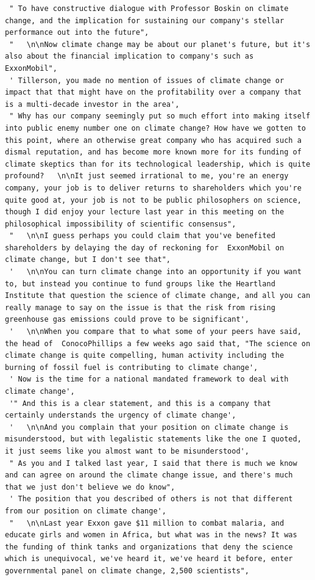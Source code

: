 \documentclass[
  letterpaper,
  DIV=11,
  numbers=noendperiod]{scrreprt}
\begin{document}
\begin{verbatim}
 " To have constructive dialogue with Professor Boskin on climate change, and the implication for sustaining our company's stellar performance out into the future",
 "   \n\nNow climate change may be about our planet's future, but it's also about the financial implication to company's such as  ExxonMobil",
 ' Tillerson, you made no mention of issues of climate change or impact that that might have on the profitability over a company that is a multi-decade investor in the area',
 " Why has our company seemingly put so much effort into making itself into public enemy number one on climate change? How have we gotten to this point, where an otherwise great company who has acquired such a dismal reputation, and has become more known more for its funding of climate skeptics than for its technological leadership, which is quite profound?   \n\nIt just seemed irrational to me, you're an energy company, your job is to deliver returns to shareholders which you're quite good at, your job is not to be public philosophers on science, though I did enjoy your lecture last year in this meeting on the philosophical impossibility of scientific consensus",
 "   \n\nI guess perhaps you could claim that you've benefited shareholders by delaying the day of reckoning for  ExxonMobil on climate change, but I don't see that",
 '   \n\nYou can turn climate change into an opportunity if you want to, but instead you continue to fund groups like the Heartland Institute that question the science of climate change, and all you can really manage to say on the issue is that the risk from rising greenhouse gas emissions could prove to be significant',
 '   \n\nWhen you compare that to what some of your peers have said, the head of  ConocoPhillips a few weeks ago said that, "The science on climate change is quite compelling, human activity including the burning of fossil fuel is contributing to climate change',
 ' Now is the time for a national mandated framework to deal with climate change',
 '" And this is a clear statement, and this is a company that certainly understands the urgency of climate change',
 '   \n\nAnd you complain that your position on climate change is misunderstood, but with legalistic statements like the one I quoted, it just seems like you almost want to be misunderstood',
 " As you and I talked last year, I said that there is much we know and can agree on around the climate change issue, and there's much that we just don't believe we do know",
 ' The position that you described of others is not that different from our position on climate change',
 "   \n\nLast year Exxon gave $11 million to combat malaria, and educate girls and women in Africa, but what was in the news? It was the funding of think tanks and organizations that deny the science which is unequivocal, we've heard it, we've heard it before, enter governmental panel on climate change, 2,500 scientists",

\end{verbatim}
\end{document}
